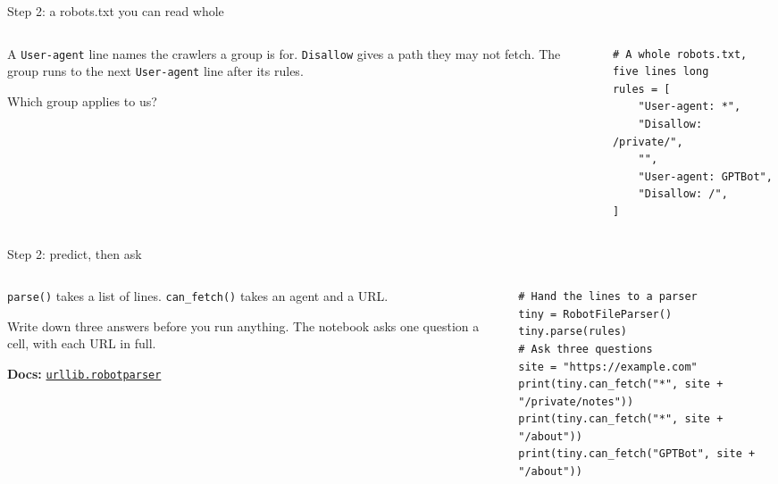 \documentclass[9pt,aspectratio=169]{beamer}
\begin{document}
\begin{frame}[fragile]{Step 2: a robots.txt you can read whole}
    \begin{columns}[T]
        \begin{column}{0.37\textwidth}
            A \texttt{User-agent} line names the crawlers a group is for. \texttt{Disallow} gives a path they may not fetch. The group runs to the next \texttt{User-agent} line after its rules.

            \medskip
            Which group applies to us?
        \end{column}
        \begin{column}{0.6\textwidth}
\begin{lstlisting}[basicstyle=\ttfamily\footnotesize]
# A whole robots.txt, five lines long
rules = [
    "User-agent: *",
    "Disallow: /private/",
    "",
    "User-agent: GPTBot",
    "Disallow: /",
]
\end{lstlisting}
        \end{column}
    \end{columns}
\end{frame}

\begin{frame}[fragile]{Step 2: predict, then ask}
    \begin{columns}[T]
        \begin{column}{0.37\textwidth}
            \texttt{parse()} takes a list of lines. \texttt{can\_fetch()} takes an agent and a URL.

            \medskip
            Write down three answers before you run anything. The notebook asks one question a cell, with each URL in full.

            \medskip
            {\scriptsize\textbf{Docs:} \href{https://docs.python.org/3/library/urllib.robotparser.html}{\texttt{urllib.robotparser}}\par}
        \end{column}
        \begin{column}{0.6\textwidth}
\begin{lstlisting}[basicstyle=\ttfamily\footnotesize]
# Hand the lines to a parser
tiny = RobotFileParser()
tiny.parse(rules)
# Ask three questions
site = "https://example.com"
print(tiny.can_fetch("*", site + "/private/notes"))
print(tiny.can_fetch("*", site + "/about"))
print(tiny.can_fetch("GPTBot", site + "/about"))
\end{lstlisting}
        \end{column}
    \end{columns}
\end{frame}
\end{document}
